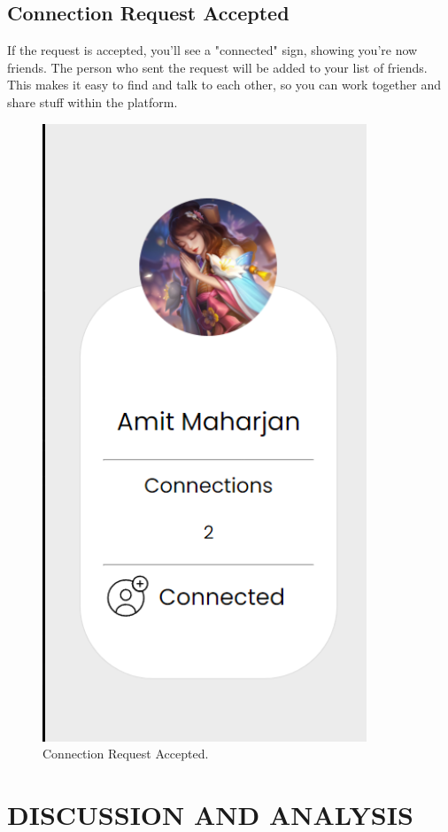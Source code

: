 \section{Connection Request Accepted}
If the request is accepted, you'll see a "connected" sign, showing you're now friends. The person who sent the request will be added to your list of friends. This makes it easy to find and talk to each other, so you can work together and share stuff within the platform.
\begin{figure}[ht]
    \centering
    \includegraphics[height=0.3\textheight]{Outcome-ss/result-after-accepting.png}
    \caption{Connection Request Accepted.}
    \label{fig:Connection Request Accepted}
\end{figure}
\chapter{DISCUSSION AND ANALYSIS}

